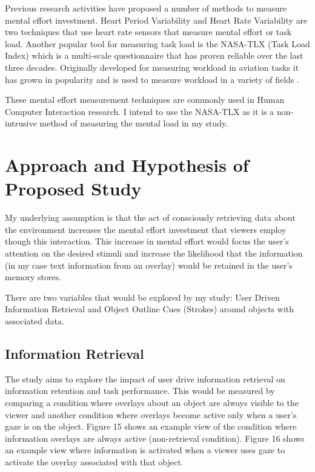 \documentclass{article}
\begin{document}
Previous research activities have proposed a number of methods to measure mental effort investment. Heart Period Variability  \cite{Lajos} and Heart Rate Variability \cite{Rowe:1998:HRV:274644.274709} are two techniques that use heart rate sensors that measure mental effort or task load. Another popular tool for measuring task load is the NASA-TLX (Task Load Index) \cite{HART1988139} which is a multi-scale questionnaire that has proven reliable over the last three decades. Originally developed for measuring workload in aviation tasks it has grown in popularity and is used to measure workload in a variety of fields \cite{Hartdoi:10.1177/154193120605000909}. 

These mental effort measurement techniques are commonly used in Human Computer Interaction research. I intend to use the NASA-TLX as it is a non-intrusive method of measuring the mental load in my study.

\section{Approach and Hypothesis of Proposed Study} \label{Approach}

My underlying assumption is that the act of consciously retrieving data about the environment increases the mental effort investment that viewers employ though this interaction.  This increase in mental effort would focus the user’s attention on the desired stimuli and increase the likelihood that the information (in my case text information from an overlay) would be retained in the user’s memory stores.

There are two variables that would be explored by my study: User Driven Information Retrieval and Object Outline Cues (Strokes) around objects with associated data.

\subsection{Information Retrieval}
The study aims to explore the impact of user drive information retrieval on information retention and task performance. This would be measured by comparing a condition where overlays about an object are always visible to the viewer and another condition where overlays become active only when a user's gaze is on the object. Figure 15 shows an example view of the condition where information overlays are always active (non-retrieval condition). Figure 16 shows an example view where information is activated when a viewer uses gaze to activate the overlay associated with that object.
\end{document}
